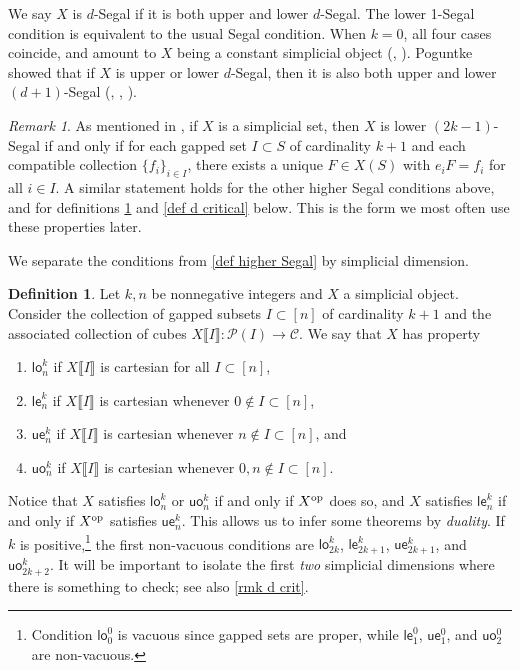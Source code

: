 \documentclass{amsart}
\newcommand{\cube}[1]{\llbracket #1 \rrbracket}
\newcommand{\lowev}{\mathsf{le}}
\newcommand{\lowod}{\mathsf{lo}}
\newcommand{\uppev}{\mathsf{ue}}
\newcommand{\uppod}{\mathsf{uo}}
\newcommand{\ps}{\mathcal{P}}
\newcommand{\op}{\textup{op}}
\theoremstyle{definition}
\newtheorem{definition}[theorem]{Definition}
\theoremstyle{remark}
\newtheorem{remark}[theorem]{Remark}
\begin{document}
We say $X$ is $d$-Segal if it is both upper and lower $d$-Segal.
The lower 1-Segal condition is equivalent to the usual Segal condition.
When $k=0$, all four cases coincide, and amount to $X$ being a constant simplicial object (\cite[Example~3.9]{Dyckerhoff:CPOC}, \cite[Remark~3.11]{HackneyLynd:HSSPG}).
Poguntke showed that if $X$ is upper or lower $d$-Segal, then it is also both upper and lower $(d{+}1)$-Segal (\cite[Theorem~5.1]{Dyckerhoff:CPOC}, \cite[Proposition~3.14]{HackneyLynd:HSSPG}, \cite[Proposition~2.10]{Poguntke:HSSAKT}).

\begin{remark}
As mentioned in \cite[Remark 3.8]{HackneyLynd:HSSPG}, if $X$ is a simplicial set, then $X$ is lower $(2k{-}1)$-Segal if and only if for each gapped set $I\subset S$ of cardinality $k+1$ and each compatible collection $\{f_i\}_{i\in I}$, there exists a unique $F\in X(S)$ with $e_i F = f_i$ for all $i\in I$.
A similar statement holds for the other higher Segal conditions above, and for definitions \ref{def segal properties} and \ref{def d critical} below.
This is the form we most often use these properties later.
\end{remark}

We separate the conditions from \cref{def higher Segal} by simplicial dimension.

\begin{definition}\label{def segal properties}
Let $k,n$ be nonnegative integers and $X$ a simplicial object.
Consider the collection of gapped subsets $I \subset [n]$ of cardinality $k+1$ and the associated collection of cubes $X\cube{I} \colon \ps(I) \to \mathcal{C}$.
We say that $X$ has property
\begin{enumerate}
\item $\lowod^k_n$ if $X\cube{I}$ is cartesian for all $I \subset [n]$,
\item $\lowev^k_n$ if $X\cube{I}$ is cartesian whenever $0 \notin I \subset [n]$,
\item $\uppev^k_n$ if $X\cube{I}$ is cartesian whenever $n \notin I \subset [n]$, and
\item $\uppod^k_n$ if $X\cube{I}$ is cartesian whenever $0,n \notin I \subset [n]$.
\end{enumerate}
\end{definition}

Notice that $X$ satisfies $\lowod^k_n$ or $\uppod^k_n$ if and only if $X^\op$ does so, and $X$ satisfies $\lowev^k_n$ if and only if $X^\op$ satisfies $\uppev^k_n$.
This allows us to infer some theorems by \emph{duality}.
If $k$ is positive,\footnote{Condition $\lowod^0_0$ is vacuous since gapped sets are proper, while $\lowev_1^0$, $\uppev_1^0$, and $\uppod_2^0$ are non-vacuous.} the first non-vacuous conditions are $\lowod^k_{2k}$, $\lowev^k_{2k+1}$, $\uppev^k_{2k+1}$, and $\uppod^k_{2k+2}$.
It will be important to isolate the first \emph{two} simplicial dimensions where there is something to check; see also \cref{rmk d crit}.
\end{document}
